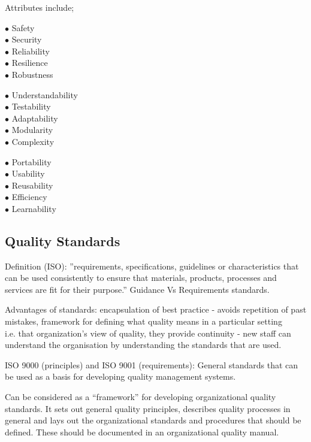 \documentclass[]{project_plan}
\newcommand{\bulletPoint}{\hspace{-3.1pt}$\bullet$ \hspace{5pt}}
\begin{document}
Attributes include;\\
\begin{minipage}[]{.3\linewidth}
  \bulletPoint Safety\\
  \bulletPoint Security\\
  \bulletPoint Reliability\\
  \bulletPoint Resilience\\
  \bulletPoint Robustness
\end{minipage}
\hfill
\begin{minipage}[]{.3\linewidth}
  \bulletPoint Understandability\\
  \bulletPoint Testability\\
  \bulletPoint Adaptability\\
  \bulletPoint Modularity\\
  \bulletPoint Complexity
\end{minipage}
\hfill
\begin{minipage}[]{.3\linewidth}
  \bulletPoint Portability\\
  \bulletPoint Usability\\
  \bulletPoint Reusability\\
  \bulletPoint Efficiency\\
  \bulletPoint Learnability
\end{minipage}

\newpage

\subsection{Quality Standards}

Definition (ISO): ”requirements, specifications, guidelines or characteristics that can be used consistently to
ensure that materials, products, processes and services are fit for their purpose.” Guidance Vs Requirements
standards.

Advantages of standards: encapsulation of best practice - avoids repetition of past mistakes, framework for
defining what quality means in a particular setting\\
i.e. that organization’s view of quality, they provide
continuity - new staff can understand the organisation by understanding the standards that are used.

ISO 9000 (principles) and ISO 9001 (requirements): General standards that can be used as a basis for
developing quality management systems.

Can be considered as a “framework” for developing organizational quality standards. It sets out general
quality principles, describes quality processes in general and lays out the organizational standards and
procedures that should be defined. These should be documented in an organizational quality manual.
\end{document}
